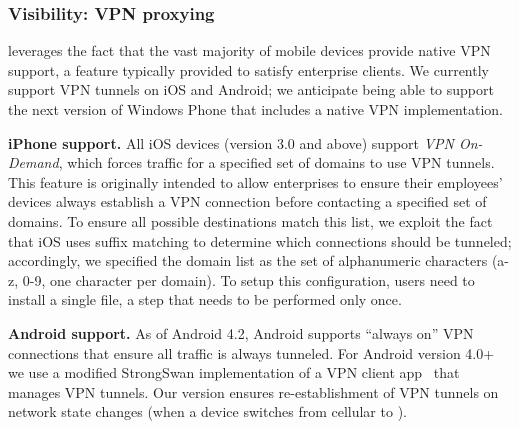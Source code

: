 %


\subsubsection{Visibility: VPN proxying}
\label{subsec:design_visibility}

\meddle leverages the fact that the vast majority of mobile devices provide native VPN support, a feature typically provided to satisfy enterprise clients. We currently support VPN tunnels on iOS and Android; we anticipate being able to support the next version of Windows Phone that includes a native VPN implementation.

\noindent\textbf{iPhone support.} 
All iOS devices (version 3.0 and above) support \textit{VPN On-Demand}, which forces traffic for a specified set of domains to use VPN tunnels. 
This feature is originally intended to allow enterprises to ensure their employees' devices always establish a VPN connection before contacting a specified set of domains. 
To ensure all possible destinations match this list, we exploit the fact that iOS uses suffix matching to determine which connections should be tunneled; accordingly, we specified the domain list as the set of alphanumeric characters (a-z, 0-9, one character per domain). 
To setup this configuration, users need to install a single file, a step that needs to be performed only once. 

\noindent\textbf{Android support.} As of Android 4.2, Android supports ``always on'' VPN connections that ensure all traffic is always tunneled.
For Android version 4.0+ we use a modified StrongSwan implementation of a VPN client app~\cite{strongswanclient}  that 
manages VPN tunnels. 
Our version ensures re-establishment of VPN tunnels on network state changes (\eg when a device switches from cellular to \wifi).

